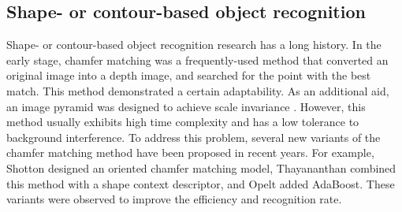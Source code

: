 \documentclass[journal]{IEEEtran}
\begin{document}
\subsection{Shape- or contour-based object recognition}

Shape- or contour-based object recognition research has a long history. 
In the early stage, chamfer matching \cite{borgefors1988,shotton2005,thayananthan2003,opelt2006} 
was a frequently-used method that converted an original image into a depth image, 
and searched for the point with the best match. 
This method demonstrated a certain adaptability. 
As an additional aid, an image pyramid was designed to achieve scale invariance \cite{borgefors1988}. 
However, this method usually exhibits high time complexity and has a low tolerance to background interference. 
To address this problem, several new variants of the chamfer matching method have been proposed in recent years. 
For example, Shotton \cite{shotton2005} designed an oriented chamfer matching model, 
Thayananthan \cite{thayananthan2003} combined this method with a shape context descriptor, 
and Opelt \cite{thayananthan2003} added AdaBoost. 
These variants were observed to improve the efficiency and recognition rate.
\end{document}
